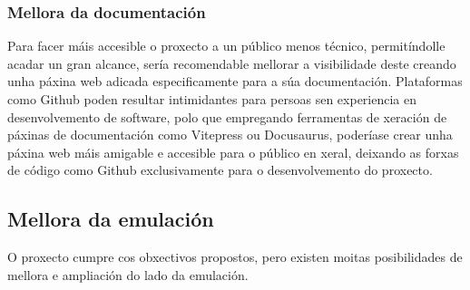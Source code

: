 \subsubsection{Mellora da documentación}
Para facer máis accesible o proxecto a un público menos técnico, permitíndolle acadar un gran alcance, sería recomendable mellorar a visibilidade deste
creando unha páxina web adicada especificamente para a súa documentación. Plataformas como Github poden resultar intimidantes para persoas sen experiencia en desenvolvemento de software,
polo que empregando ferramentas de xeración de páxinas de documentación como Vitepress ou Docusaurus, poderíase crear unha páxina web máis amigable e accesible para o público en xeral,
deixando as forxas de código como Github exclusivamente para o desenvolvemento do proxecto.


\subsection{Mellora da emulación}
O proxecto cumpre cos obxectivos propostos, pero existen moitas posibilidades de mellora e ampliación do lado da emulación.

